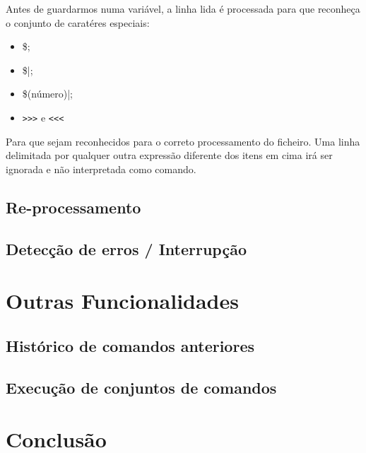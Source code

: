 \documentclass[11pt,twoside,a4paper]{report}
\begin{document}
Antes de guardarmos numa variável, a linha lida é processada para que reconheça o conjunto de caratéres especiais:
\begin{itemize}
\item \$; 
\item \$|;
\item \$(número)|;
\item \verb|>>>| e \verb|<<<|
\end{itemize}
Para que sejam reconhecidos para o correto processamento do ficheiro.
Uma linha delimitada por qualquer outra expressão diferente dos itens em cima irá ser ignorada e não interpretada como comando.


\raggedbottom
\pagebreak
\section{Re-processamento}
\section{Detecção de erros / Interrupção}

\chapter{Outras Funcionalidades}
\section{Histórico de comandos anteriores}
\section{Execução de conjuntos de comandos}

\chapter{Conclusão}
\end{document}
